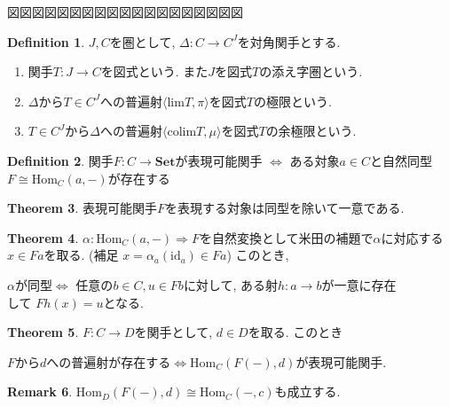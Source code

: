 \documentclass[a4paper,10pt]{article}
\theoremstyle{definition}
\newtheorem{thm}{\bfseries Theorem}[section]
\newtheorem{definition}[thm]{\bfseries Definition}
\newtheorem{remark}[thm]{\bfseries Remark}    %
\begin{document}
図図図図図図図図図図図図図図図図図図図
\begin{definition}
    $J, C$を圏として, $\Delta: C \rightarrow C^{J}$を対角関手とする.
    \begin{enumerate}[(1)]
        \item 関手$T:J \rightarrow C$を図式という. また$J$を図式$T$の添え字圏という.
        \item $\Delta$から$T \in C^{J}$への普遍射$\langle \textrm{lim}T, \pi \rangle$を図式$T$の極限という.
        \item $T \in C^{J}$から$\Delta$への普遍射$\langle \textrm{colim}T, \mu \rangle$を図式$T$の余極限という.
    \end{enumerate}
\end{definition}
\begin{definition}
    関手$F:C \rightarrow \mathbf{Set}$が表現可能関手 $\Longleftrightarrow$
    ある対象$a \in C$と自然同型$F \cong \textrm{Hom}_C(a, -)$が存在する
\end{definition}
\begin{thm}
    表現可能関手$F$を表現する対象は同型を除いて一意である.
\end{thm}
\begin{thm}
    $\alpha: \textrm{Hom}_C(a, -) \Rightarrow F$を自然変換として米田の補題で$\alpha$に対応する$x \in Fa$を取る.
    (補足 $x=\alpha_a(\textrm{id}_a) \in Fa$) このとき,
    \begin{center}
        $\alpha$が同型$\Longleftrightarrow$ 任意の$b \in C, u \in Fb$に対して, ある射$h : a \rightarrow b$が一意に存在\\して
        $Fh(x)=u$となる.
    \end{center}
\end{thm}
\begin{thm}
    $F:C \rightarrow D$を関手として, $d \in D$を取る. このとき
    \begin{center}
        $F$から$d$への普遍射が存在する$\Longleftrightarrow \textrm{Hom}_C(F(-),d)$が表現可能関手. 
    \end{center}
\end{thm}
\begin{remark}
    $\textrm{Hom}_D(F(-),d) \cong \textrm{Hom}_C(-, c)$も成立する.
\end{remark}
\end{document}
